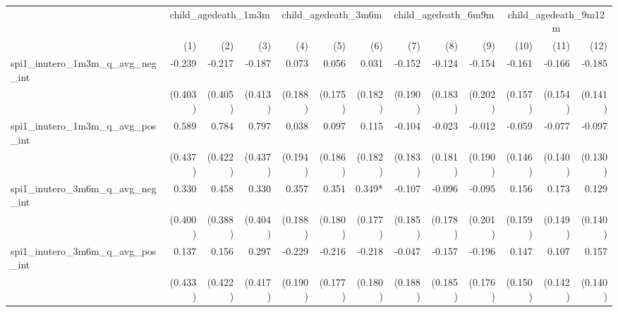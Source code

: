 \begin{tabular}{lrrrrrrrrrrrr}
\toprule
                                            &  \multicolumn{3}{c}{child\_agedeath\_1m3m} &  \multicolumn{3}{c}{child\_agedeath\_3m6m} &  \multicolumn{3}{c}{child\_agedeath\_6m9m} & \multicolumn{3}{c}{child\_agedeath\_9m12m} \\ 
\cmidrule(lr){2-4} \cmidrule(lr){5-7} \cmidrule(lr){8-10} \cmidrule(lr){11-13} 
                                            &          (1) &          (2) &          (3) &          (4) &          (5) &          (6) &          (7) &          (8) &          (9) &         (10) &         (11) &         (12) \\ 
\midrule
spi1\_inutero\_1m3m\_q\_avg\_neg\_int       &       -0.239 &       -0.217 &       -0.187 &        0.073 &        0.056 &        0.031 &       -0.152 &       -0.124 &       -0.154 &       -0.161 &       -0.166 &       -0.185 \\ 
                                            &      (0.403) &      (0.405) &      (0.413) &      (0.188) &      (0.175) &      (0.182) &      (0.190) &      (0.183) &      (0.202) &      (0.157) &      (0.154) &      (0.141) \\ 
spi1\_inutero\_1m3m\_q\_avg\_pos\_int       &        0.589 &        0.784 &        0.797 &        0.038 &        0.097 &        0.115 &       -0.104 &       -0.023 &       -0.012 &       -0.059 &       -0.077 &       -0.097 \\ 
                                            &      (0.437) &      (0.422) &      (0.437) &      (0.194) &      (0.186) &      (0.182) &      (0.183) &      (0.181) &      (0.190) &      (0.146) &      (0.140) &      (0.130) \\ 
spi1\_inutero\_3m6m\_q\_avg\_neg\_int       &        0.330 &        0.458 &        0.330 &        0.357 &        0.351 &       0.349* &       -0.107 &       -0.096 &       -0.095 &        0.156 &        0.173 &        0.129 \\ 
                                            &      (0.400) &      (0.388) &      (0.404) &      (0.188) &      (0.180) &      (0.177) &      (0.185) &      (0.178) &      (0.201) &      (0.159) &      (0.149) &      (0.140) \\ 
spi1\_inutero\_3m6m\_q\_avg\_pos\_int       &        0.137 &        0.156 &        0.297 &       -0.229 &       -0.216 &       -0.218 &       -0.047 &       -0.157 &       -0.196 &        0.147 &        0.107 &        0.157 \\ 
                                            &      (0.433) &      (0.422) &      (0.417) &      (0.190) &      (0.177) &      (0.180) &      (0.188) &      (0.185) &      (0.176) &      (0.150) &      (0.142) &      (0.140) \\ 

\end{tabular}
